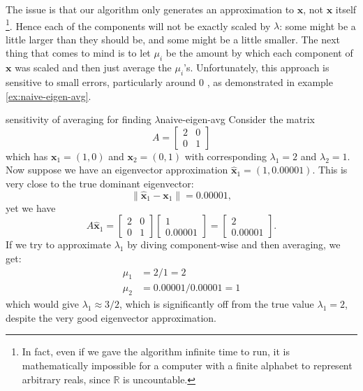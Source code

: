 \documentclass{article}
\let\vec\mathbf
\begin{document}
The issue is that our algorithm only generates an approximation to $\vec{x}$, not $\vec{x}$ itself \footnote{In fact, even if we gave the algorithm infinite time to run, it is mathematically impossible for a computer with a finite alphabet to represent arbitrary reals, since $\mathbb{R}$ is uncountable.}. Hence each of the components will not be exactly scaled by $\lambda$: some might be a little larger than they should be, and some might be a little smaller. The next thing that comes to mind is to let $\mu_i$ be the amount by which each component of $\vec{x}$ was scaled and then just average the $\mu_i$'s. Unfortunately, this approach is sensitive to small errors, particularly around $0$ \cite{mit-sensitivity}, as demonstrated in example \ref{ex:naive-eigen-avg}.

\begin{example}{sensitivity of averaging for finding $\lambda$}{naive-eigen-avg}
  Consider the matrix
  \begin{equation*}
    A = \begin{bmatrix}2 & 0 \\ 0 & 1\end{bmatrix}
  \end{equation*}
  which has $\vec{x}_1 = (1,0)$ and $\vec{x}_2 = (0,1)$ with corresponding $\lambda_1 = 2$ and $\lambda_2 = 1$. Now suppose we have an eigenvector approximation $\hat{\vec{x}}_1 = (1, 0.00001)$. This is very close to the true dominant eigenvector:
  \begin{equation*}
    \lVert \hat{\vec{x}}_1 - \vec{x}_1 \rVert = 0.00001,
  \end{equation*}
  yet we have
  \begin{equation*}
    A\hat{\vec{x}}_1 = \begin{bmatrix}2 & 0 \\ 0 & 1\end{bmatrix}\begin{bmatrix}1 \\ 0.00001\end{bmatrix} = \begin{bmatrix}2 \\ 0.00001\end{bmatrix}.
  \end{equation*}
  If we try to approximate $\lambda_1$ by diving component-wise and then averaging, we get:
  \begin{align*}
    \mu_1 &= 2 / 1 = 2 \\
    \mu_2 &= 0.00001 / 0.00001 = 1
  \end{align*}
  which would give $\lambda_1 \approx 3/2$, which is significantly off from the true value $\lambda_1 = 2$, despite the very good eigenvector approximation.
\end{example}
\end{document}
